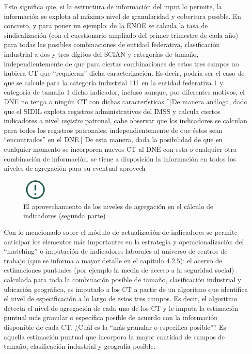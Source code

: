 \documentclass[
]{article}
\begin{document}
Esto significa que, si la estructura de información del input lo permite, la información se explota al máximo nivel de granularidad y cobertura posible. En concreto, y para poner un ejemplo: de la ENOE se calcula la tasa de sindicalización (con el cuestionario ampliado del primer trimestre de cada año) para todas las posibles combinaciones de entidad federativa, clasificación industrial a dos y tres dígitos del SCIAN y categorías de tamaño, independientemente de que para ciertas combinaciones de estos tres campos no hubiera CT que ``requieran'' dicha caracterización. Es decir, podría ser el caso de que se calcule para la categoría industrial 111 en la entidad federativa 1 y categoría de tamaño 1 dicho indicador, incluso aunque, por diferentes motivos, el DNE no tenga a ningún CT con dichas características.\^{}{[}De manera análoga, dado que el SIDIL explota registros administrativos del IMSS y calcula ciertos indicadores a nivel \emph{registro} patronal, cabe observar que los indicadores se calculan para todos los registros patronales, independientemente de que éstos sean ``encontrados'' en el DNE.{]} De esta manera, dada la posibilidad de que en cualquier momento se incorporen nuevos CT al DNE con esta o cualquier otra combinación de información, se tiene a disposición la información en todos los niveles de agregación para su eventual aprovech

\begin{figure}
\includegraphics[width=50px,style="float:left; background-color: #f5f5f5; padding-right:1em"]{images-1/important-icon} \caption{El aprovechamiento de los niveles de agregación en el cálculo de indicadores (segunda parte)}\label{fig:aprovechamientonivelesagregacion}
\end{figure}

\begin{rmdcomment}
Con lo mencionado sobre el módulo de actualización de indicadores se
permite anticipar los elementos más importantes en la estrategia y
operacionalización del ``matching'' o imputación de indicadores
laborales al universo de centros de trabajo (que se informa a mayor
detalle en el capítulo 4.2.5): el acervo de estimaciones puntuales (por
ejemplo la media de acceso a la seguridad social) calculada para toda la
combinación posible de tamaño, clasificación industrial y ubicación
geográfica, es imputado a los CT a partir de un algoritmo que identifica
el nivel de especificación a lo largo de estos tres campos. Es decir, el
algoritmo detecta el nivel de agregación de cada uno de los CT y le
imputa la estimación puntual más granular o específica posible de
acuerdo con la información disponible de cada CT. ¿Cuál es la ``más
granular o especifica posible''? Es aquella estimación puntual que
incorpora la mayor cantidad de campos de tamaño, clasificación
industrial y geografía posible.
\end{rmdcomment}
\end{document}
